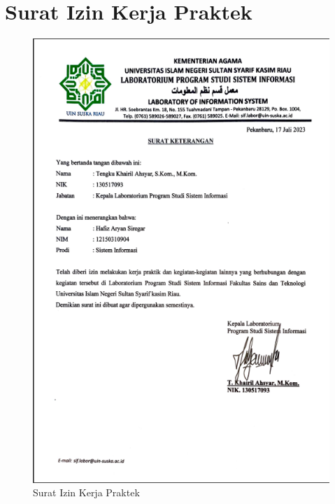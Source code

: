 %


%

\renewcommand{\thepage}{A - \arabic{page}}
\chapter{Surat Izin Kerja Praktek}
\begin{figure}
    \centering
    \includegraphics[width=1\linewidth]{konten//gambar/Surat Izin Kerja Praktek.png}
    \caption{Surat Izin Kerja Praktek}
    \label{fig:enter-label}
\end{figure}
